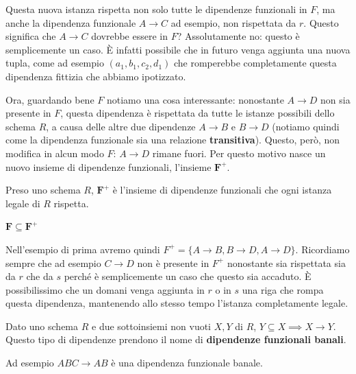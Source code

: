 \documentclass[11pt, a4paper, titlepage, oneside]{scrbook}
\begin{document}
Questa nuova istanza rispetta non solo tutte le dipendenze funzionali in $F$, ma anche la dipendenza funzionale $A \longrightarrow C$ ad esempio, non rispettata da $r$. Questo significa che $A \longrightarrow C$ dovrebbe essere in $F$? Assolutamente no: questo è semplicemente un caso. È infatti possibile che in futuro venga aggiunta una nuova tupla, come ad esempio $(a_1, b_1, c_2, d_1)$ che romperebbe completamente questa dipendenza fittizia che abbiamo ipotizzato. 

Ora, guardando bene $F$ notiamo una cosa interessante: nonostante $A \longrightarrow D$ non sia presente in $F$, questa dipendenza è rispettata da tutte le istanze possibili dello schema $R$, a causa delle altre due dipendenze $A \longrightarrow B$ e $B \longrightarrow D$ (notiamo quindi come la dipendenza funzionale sia una relazione \textbf{transitiva}). Questo, però, non modifica in alcun modo $F$: $A \longrightarrow D$ rimane fuori. Per questo motivo nasce un nuovo insieme di dipendenze funzionali, l'insieme $\bm{F^+}$.

\begin{Definizione}[$\bm{F^+}$]
\label{def-F+}
Preso uno schema $R$, $\bm{F^+}$ è l'insieme di dipendenze funzionali che ogni istanza legale di $R$ rispetta. 
\end{Definizione}

\begin{Proposizione}[Corollario]
\label{corol-F+}
$\bm{F \subseteq F^+}$
\end{Proposizione}

Nell'esempio di prima avremo quindi $F^+ = \{A \longrightarrow B, B \longrightarrow D, A \longrightarrow D\}$. Ricordiamo sempre che ad esempio $C \longrightarrow D$ non è presente in $F^+$ nonostante sia rispettata sia da $r$ che da $s$ perché è semplicemente un caso che questo sia accaduto. È possibilissimo che un domani venga aggiunta in $r$ o in $s$ una riga che rompa questa dipendenza, mantenendo allo stesso tempo l'istanza completamente legale.

\begin{Proposizione}
\label{propos-dipendenza-funzionale-banale}
Dato uno schema $R$ e due sottoinsiemi non vuoti $X,Y$ di $R$, $Y \subseteq X \implies X \longrightarrow Y$. Questo tipo di dipendenze prendono il nome di \textbf{dipendenze funzionali banali}.
\end{Proposizione}

Ad esempio $ABC \longrightarrow AB$ è una dipendenza funzionale banale.
\end{document}
